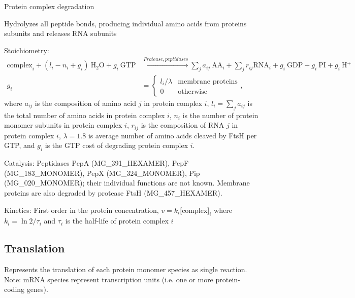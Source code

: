 \documentclass[10pt]{article}
\begin{document}
\begin{compactitem}
\begin{compactitem}
    \end{compactitem}
\item Protein complex degradation
    \begin{compactitem}
    \item Hydrolyzes all peptide bonds, producing individual amino acids from proteins subunits and releases RNA subunits
    \item Stoichiometry: 
        \begin{align*}
        \text{complex}_i + (l_i - n_i + g_i)~\text{H$_\text{2}$O} + g_i~\text{GTP} & \xrightarrow{Protease, peptidases} \sum_j a_{ij}~\text{AA}_i + \sum_j r_{ij} \text{RNA}_i + g_i~\text{GDP} + g_i~\text{PI} + g_i~\text{H$^\text{+}$}\\
        g_i & = \begin{cases}
                l_i / \lambda & \text{membrane proteins}\\
                0 & \text{otherwise}
                \end{cases},
        \end{align*}    
        where $a_{ij}$ is the composition of amino acid $j$ in protein complex $i$, $l_i = \sum_j a_{ij}$ is the total number of amino acids in protein complex $i$, $n_i$ is the number of protein monomer subunits in protein complex $i$, $r_{ij}$ is the composition of RNA $j$ in protein complex $i$, $\lambda=1.8$ is average number of amino acids cleaved by FtsH per GTP, and $g_i$ is the GTP cost of degrading protein complex $i$.
    \item Catalysis: Peptidases PepA (MG\_391\_HEXAMER), PepF (MG\_183\_MONOMER), PepX (MG\_324\_MONOMER), Pip (MG\_020\_MONOMER); their individual functions are not known. Membrane proteins are also degraded by protease FtsH  (MG\_457\_HEXAMER).
    \item Kinetics:  First order in the protein concentration, $v = k_i \text{[complex]}_i$ where $k_i = \ln{2} / \tau_i$ and $\tau_i$ is the half-life of protein complex $i$

    \end{compactitem}

\end{compactitem}


\subsection{Translation}
Represents the translation of each protein monomer species as single reaction. Note: mRNA species represent transcription units (i.e. one or more protein-coding genes).
\end{document}
